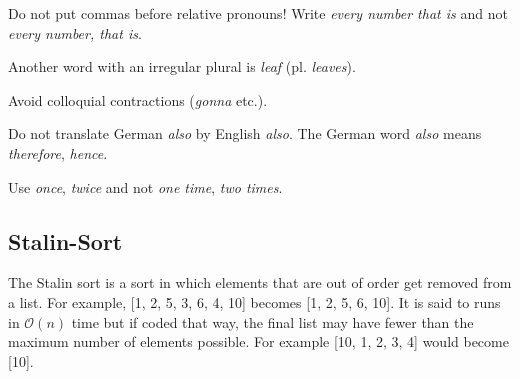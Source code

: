 \documentclass[a4paper]{article}
\begin{document}
Do not put commas before relative pronouns! Write \emph{every number that is} and not \emph{every number, that is}.

Another word with an irregular plural is \emph{leaf} (pl. \emph{leaves}).

Avoid colloquial contractions (\emph{gonna} etc.).

Do not translate German \emph{also} by English \emph{also}. The German word \emph{also} means \emph{therefore}, \emph{hence}.

Use \emph{once}, \emph{twice} and not \emph{one time}, \emph{two times}.

\subsection{Stalin-Sort}
The Stalin sort is a sort in which elements that are out of order get removed from a list. For example, [1, 2, 5, 3, 6, 4, 10] becomes [1, 2, 5, 6, 10]. It is said to runs in $\mathcal{O}(n)$ time but if coded that way, the final list may have fewer than the maximum number of elements possible. For example [10, 1, 2, 3, 4] would become [10].
\end{document}
